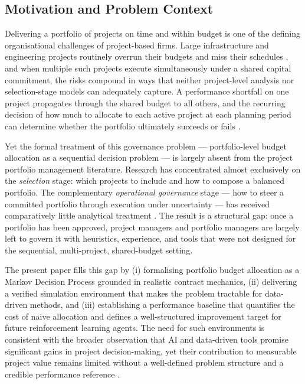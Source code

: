 
\subsection{Motivation and Problem Context}
\label{subsec:motivation}

Delivering a portfolio of projects on time and within budget is one
of the defining organisational challenges of project-based firms.
Large infrastructure and engineering projects routinely overrun their
budgets and miss their schedules \citep{Flyvbjerg2003, Merrow2011},
and when multiple such projects execute simultaneously under a shared
capital commitment, the risks compound in ways that neither project-level
analysis nor selection-stage models can adequately capture.
A performance shortfall on one project propagates through the shared budget
to all others, and the recurring decision of how much to allocate to each
active project at each planning period can determine whether the portfolio
ultimately succeeds or fails \citep{Mottee2026, Uusitalo2026}.

Yet the formal treatment of this governance problem --- portfolio-level
budget allocation as a sequential decision problem --- is largely absent
from the project portfolio management literature. Research has
concentrated almost exclusively on the \emph{selection} stage: which
projects to include and how to compose a balanced portfolio.
The complementary \emph{operational governance} stage --- how to steer a
committed portfolio through execution under uncertainty --- has received
comparatively little analytical treatment \citep{Archer1999, Cooper2001,
Turner2014, Zwikael2026, Luan2026}. The result is a structural gap: once
a portfolio has been approved, project managers and portfolio managers
are largely left to govern it with heuristics, experience, and tools that
were not designed for the sequential, multi-project, shared-budget setting.

The present paper fills this gap by (i) formalising portfolio budget
allocation as a Markov Decision Process grounded in realistic contract
mechanics, (ii) delivering a verified simulation environment that makes
the problem tractable for data-driven methods, and (iii) establishing a
performance baseline that quantifies the cost of naive allocation and
defines a well-structured improvement target for future reinforcement
learning agents. The need for such environments is consistent with the
broader observation that AI and data-driven tools promise significant
gains in project decision-making, yet their contribution to measurable
project value remains limited without a well-defined problem structure
and a credible performance reference \citep{Mariani2026, Pompei2026}.

